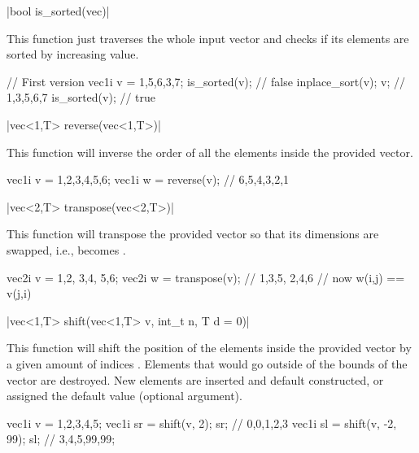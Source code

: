 \funcitem \cppinline|bool is_sorted(vec)| 

This function just traverses the whole input vector and checks if its elements are sorted by increasing value.

\begin{example}
\begin{cppcode}
// First version
vec1i v = {1,5,6,3,7};
is_sorted(v); // false
inplace_sort(v);
v; // {1,3,5,6,7}
is_sorted(v); // true
\end{cppcode}
\end{example}

\funcitem \cppinline|vec<1,T> reverse(vec<1,T>)| 

This function will inverse the order of all the elements inside the provided vector.

\begin{example}
\begin{cppcode}
vec1i v = {1,2,3,4,5,6};
vec1i w = reverse(v); // {6,5,4,3,2,1}
\end{cppcode}
\end{example}

\funcitem \cppinline|vec<2,T> transpose(vec<2,T>)| 

This function will transpose the provided vector so that its dimensions are swapped, i.e.,  becomes .

\begin{example}
\begin{cppcode}
vec2i v = {{1,2}, {3,4}, {5,6}};
vec2i w = transpose(v); // {{1,3,5}, {2,4,6}}
// now w(i,j) == v(j,i)
\end{cppcode}
\end{example}

\funcitem \cppinline|vec<1,T> shift(vec<1,T> v, int_t n, T d = 0)| 

This function will shift the position of the elements inside the provided vector  by a given amount of indices . Elements that would go outside of the bounds of the vector are destroyed. New elements are inserted and default constructed, or assigned the default value  (optional argument).

\begin{example}
\begin{cppcode}
vec1i v = {1,2,3,4,5};
vec1i sr = shift(v, 2);
sr; // {0,0,1,2,3}
vec1i sl = shift(v, -2, 99);
sl; // {3,4,5,99,99};
\end{cppcode}
\end{example}

